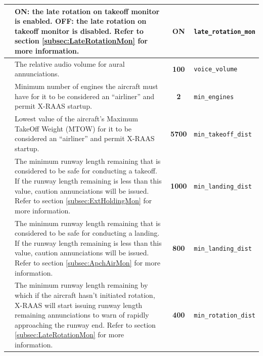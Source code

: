 \documentclass[a4paper,12pt]{article}
\newcommand{\confopt}[1]{\texttt{#1}}
\begin{document}
{\begin{center}
\begin{supertabular}{|c|p{8cm}|c|l|}
 &
\textbf{ON:} the late rotation on takeoff monitor is enabled.\newline
\textbf{OFF:} the late rotation on takeoff monitor is disabled.\newline
Refer to section \ref{subsec:LateRotationMon} for more information. &
\textbf{ON} & \confopt{late\_rotation\_mon} \\

\hline

 & The relative audio volume for aural annunciations. &
\textbf{100} & \confopt{voice\_volume} \\

\hline

 &
Minimum number of engines the aircraft must have for it to be considered
an ``airliner'' and permit X-RAAS startup. & \textbf{2} &
\confopt{min\_engines} \\

\hline

 &
Lowest value of the aircraft's Maximum TakeOff Weight (MTOW) for it to be
considered an ``airliner'' and permit X-RAAS startup. & \textbf{5700} &
\confopt{min\_takeoff\_dist} \\

\hline

 &
The minimum runway length remaining that is considered to be safe for
conducting a takeoff. If the runway length remaining is less than this
value, caution annunciations will be issued.\newline
Refer to section \ref{subsec:ExtHoldingMon} for more information. &
\textbf{1000} & \confopt{min\_landing\_dist} \\

\hline

 &
The minimum runway length remaining that is considered to be safe for
conducting a landing. If the runway length remaining is less than this
value, caution annunciations will be issued.\newline
Refer to section \ref{subsec:ApchAirMon} for more information. &
\textbf{800} & \confopt{min\_landing\_dist} \\

\hline

 &
The minimum runway length remaining by which if the aircraft hasn't
initiated rotation, X-RAAS will start issuing runway length remaining
annunciations to warn of rapidly approaching the runway end.\newline
Refer to section \ref{subsec:LateRotationMon} for more information. &
\textbf{400} & \confopt{min\_rotation\_dist} \\


\end{supertabular}
\end{center}}
\end{document}
